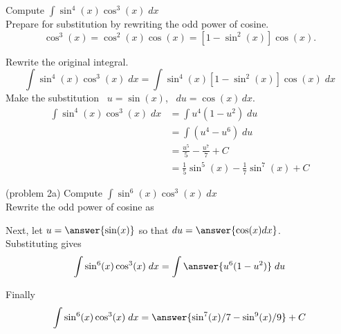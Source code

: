 \documentclass{ximera}
\begin{document}
\begin{example}[example 2]
Compute $\displaystyle{\int \sin^4(x)\cos^3(x) \; dx}$\\


Prepare for substitution by rewriting the odd power of cosine.
\[
\cos^3(x) = \cos^2(x) \cos(x) = \left[1 - \sin^2(x)\right] \cos(x).
\]

Rewrite the original integral.
\[
\int \sin^4(x)\cos^3(x) \; dx = \int \sin^4(x)\left[1 - \sin^2(x)\right] \cos(x) \; dx
\]
Make the substitution \, $u = \sin(x)$,  \, $du = \cos(x) \, dx$.
\begin{align*}
\int \sin^4(x)\cos^3(x) \; dx &= \int u^4 (1-u^2) \; du\\
   &= \int (u^4 -u^6) \; du\\
  &= \frac{u^5}{5} - \frac{u^7}{7} + C \\
  &= \frac15 \sin^5(x) - \frac17 \sin^7(x) + C
\end{align*}
  
\end{example}



\begin{problem}(problem 2a)
Compute $\displaystyle{\int \sin^6(x)\cos^3(x) \; dx}$\\

Rewrite the odd power of cosine as

\begin{multipleChoice}
\end{multipleChoice}

Next, let $u = \answer{\sin(x)}$ so that $du = \answer{\cos(x) dx}$.\\

Substituting gives 
\[
\int \sin^6(x)\cos^3(x) \; dx= \int \answer{u^6(1-u^2)} \; du
\]

Finally 
\[
\int \sin^6(x)\cos^3(x) \; dx= \answer{\sin^7(x)/7 -  \sin^9(x)/9} + C
\]

\end{problem}
\end{document}
